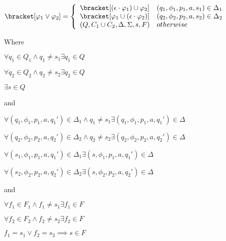 $\bracket[\varphi_1\vee\varphi_2]=\left\{\begin{array}{ll}
    \bracket[(\epsilon\cdot\varphi_1)\cup\varphi_2] & (q_1,\phi_1,p_1,a,s_1)\in\Delta_1 \\
    \bracket[\varphi_1\cup(\epsilon\cdot\varphi_2)] & (q_2,\phi_2,p_2,a,s_2)\in\Delta_2 \\
    (Q,C_1\cup C_2,\Delta,\Sigma,s,F) & otherwise \\
    \end{array}\right.
    $
    
    Where
    
    $\forall q_1\in Q_1 \wedge q_1\neq s_1\exists q_1\in Q$
    
    $\forall q_2\in Q_2 \wedge q_2\neq s_2\exists q_2\in Q$
    
    $\exists s \in Q$
    
    and
    
    $\forall (q_1,\phi_1,p_1,a,q_1')\in\Delta_1\wedge q_1\neq s_1\exists(q_1,\phi_1,p_1,a,q_1')\in\Delta$
    
    $\forall (q_2,\phi_2,p_2,a,q_2')\in\Delta_2\wedge q_2\neq s_2\exists(q_2,\phi_2,p_2,a,q_2')\in\Delta$
    
    $\forall (s_1,\phi_1,p_1,a,q_1')\in\Delta_1\exists(s,\phi_1,p_1,a,q_1')\in\Delta$
    
    $\forall (s_2,\phi_2,p_2,a,q_2')\in\Delta_2\exists(s,\phi_2,p_2,a,q_2')\in\Delta$
    
    and
    
    $\forall f_1\in F_1 \wedge f_1\neq s_1\exists f_1\in F$
    
    $\forall f_2\in F_2 \wedge f_2\neq s_2\exists f_2\in F$
    
    $f_1=s_1\vee f_2=s_2 \implies s \in F$